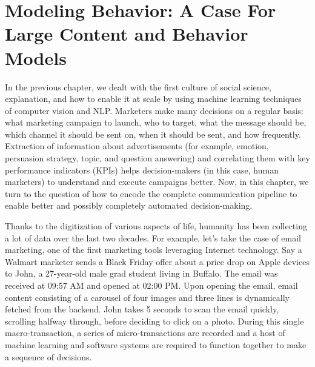 \newcommand{\companyName}{in-house~}

\chapter{Modeling Behavior: A Case For Large Content and Behavior Models}
\label{chatper:Content and Behavior Models}

In the previous chapter, we dealt with the first culture of social science, explanation, and how to enable it at scale by using machine learning techniques of computer vision and NLP. Marketers make many decisions on a regular basis: what marketing campaign to launch, who to target, what the message should be, which channel it should be sent on, when it should be sent, and how frequently. Extraction of information about advertisements (for example, emotion, persuasion strategy, topic, and question answering) and correlating them with key performance indicators (KPIs) helps decision-makers (in this case, human marketers) to understand and execute campaigns better. Now, in this chapter, we turn to the question of how to encode the complete communication pipeline to enable better and possibly completely automated decision-making. 


Thanks to the digitization of various aspects of life, humanity has been collecting a lot of data over the last two decades. For example, let's take the case of email marketing, one of the first marketing tools leveraging Internet technology. Say a Walmart marketer sends a Black Friday offer about a price drop on Apple devices to John, a 27-year-old male grad student living in Buffalo. The email was received at 09:57 AM and opened at 02:00 PM. Upon opening the email, email content consisting of a carousel of four images and three lines is dynamically fetched from the backend. John takes 5 seconds to scan the email quickly, scrolling halfway through, before deciding to click on a photo. During this single macro-transaction, a series of micro-transactions are recorded and a host of machine learning and software systems are required to function together to make a sequence of decisions. 

